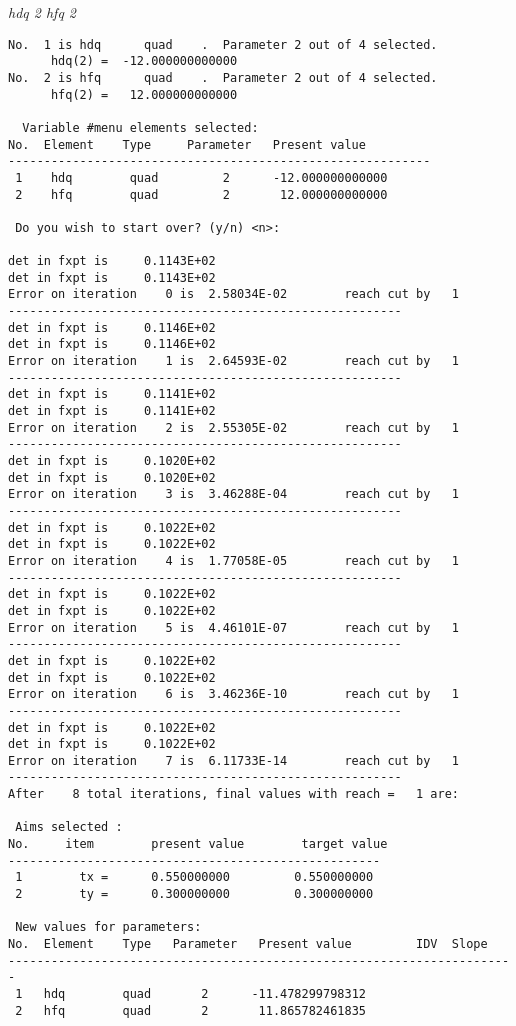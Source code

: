 {\em hdq 2 hfq 2}
\begin{footnotesize}
\begin{verbatim}
No.  1 is hdq      quad    .  Parameter 2 out of 4 selected.
      hdq(2) =  -12.000000000000
No.  2 is hfq      quad    .  Parameter 2 out of 4 selected.
      hfq(2) =   12.000000000000

  Variable #menu elements selected:
No.  Element    Type     Parameter   Present value
-----------------------------------------------------------
 1    hdq        quad         2      -12.000000000000
 2    hfq        quad         2       12.000000000000

 Do you wish to start over? (y/n) <n>:

det in fxpt is     0.1143E+02
det in fxpt is     0.1143E+02
Error on iteration    0 is  2.58034E-02        reach cut by   1
-------------------------------------------------------
det in fxpt is     0.1146E+02
det in fxpt is     0.1146E+02
Error on iteration    1 is  2.64593E-02        reach cut by   1
-------------------------------------------------------
det in fxpt is     0.1141E+02
det in fxpt is     0.1141E+02
Error on iteration    2 is  2.55305E-02        reach cut by   1
-------------------------------------------------------
det in fxpt is     0.1020E+02
det in fxpt is     0.1020E+02
Error on iteration    3 is  3.46288E-04        reach cut by   1
-------------------------------------------------------
det in fxpt is     0.1022E+02
det in fxpt is     0.1022E+02
Error on iteration    4 is  1.77058E-05        reach cut by   1
-------------------------------------------------------
det in fxpt is     0.1022E+02
det in fxpt is     0.1022E+02
Error on iteration    5 is  4.46101E-07        reach cut by   1
-------------------------------------------------------
det in fxpt is     0.1022E+02
det in fxpt is     0.1022E+02
Error on iteration    6 is  3.46236E-10        reach cut by   1
-------------------------------------------------------
det in fxpt is     0.1022E+02
det in fxpt is     0.1022E+02
Error on iteration    7 is  6.11733E-14        reach cut by   1
-------------------------------------------------------
After    8 total iterations, final values with reach =   1 are:

 Aims selected :
No.     item        present value        target value
----------------------------------------------------
 1        tx =      0.550000000         0.550000000
 2        ty =      0.300000000         0.300000000

 New values for parameters:
No.  Element    Type   Parameter   Present value         IDV  Slope
-----------------------------------------------------------------------
 1   hdq        quad       2      -11.478299798312
 2   hfq        quad       2       11.865782461835


\end{verbatim}
\end{footnotesize}
